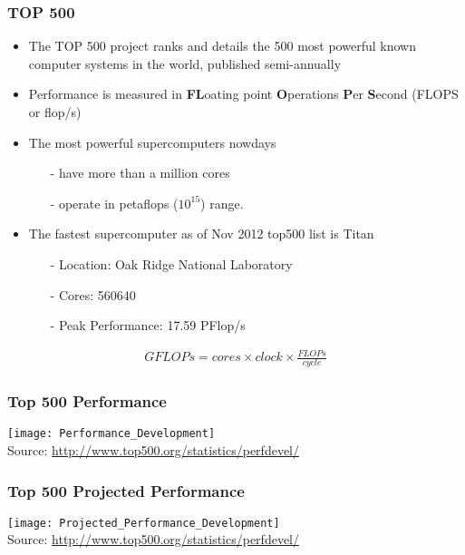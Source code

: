 \documentclass[slidestop,mathserif,compress,xcolor=svgnames,table]{beamer}
\begin{document}
\begin{frame}
  \frametitle{\small TOP 500}
  \begin{itemize}
    \item The TOP 500 project ranks and details the 500 most powerful known computer systems in the world, published semi-annually
    \item Performance is measured in \textbf{FL}oating point \textbf{O}perations \textbf{P}er \textbf{S}econd (FLOPS or flop/s)
    \item The most powerful supercomputers nowdays
    \begin{itemize}
      \item[-] have more than a million cores
      \item[-] operate in petaflops ($10^{15}$) range.
    \end{itemize}
    \item The fastest supercomputer as of Nov 2012 top500 list is Titan
    \begin{itemize}
      \item[-] Location: Oak Ridge National Laboratory
      \item[-] Cores: 560640
      \item[-] Peak Performance: 17.59 PFlop/s
    \end{itemize}
  \end{itemize}
  \begin{gather*}
    GFLOPs = cores \times clock \times \frac{FLOPs}{cycle}
  \end{gather*}
\end{frame}

\begin{frame}
  \frametitle{\small Top 500 Performance}
  \begin{center}
    \texttt{[image: Performance\_Development]}\\
    {\tiny Source: \url{http://www.top500.org/statistics/perfdevel/}}
  \end{center}
\end{frame}

\begin{frame}
  \frametitle{\small Top 500 Projected Performance}
  \begin{center}
    \texttt{[image: Projected\_Performance\_Development]}\\
    {\tiny Source: \url{http://www.top500.org/statistics/perfdevel/}}
  \end{center}
\end{frame}
\end{document}
